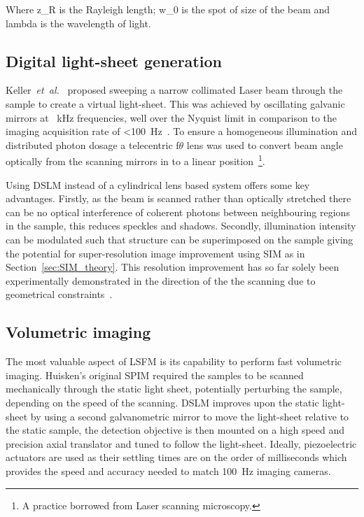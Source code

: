 Where \gls{z_R} is the \gls{Rayleigh length}; \gls{w_0} is the spot of size of the beam and \gls{lambda} is the wavelength of light.


\subsection{Digital \gls{light-sheet} generation}

Keller~\emph{et~al.}~\cite{keller_quantitative_2008} proposed sweeping a narrow collimated \gls{Laser} beam through the sample to create a \gls{virtual light-sheet}.
This was achieved by oscillating galvanic mirrors at \SI{}{\kilo\hertz} frequencies, well over the Nyquist limit in comparison to the imaging acquisition rate of \SI{<100}{\hertz}~\cite{keller_quantitative_2008}.
To ensure a homogeneous illumination and distributed photon dosage a \gls{telecentric} f\(\theta \) lens was used to convert beam angle optically from the scanning mirrors in to a linear position~\footnote{A practice borrowed from \gls{Laser} scanning microscopy.}.

Using \gls{DSLM} instead of a cylindrical lens based system offers some key advantages.
Firstly, as the beam is scanned rather than optically stretched there can be no optical interference of coherent photons between neighbouring regions in the sample, this reduces speckles and shadows.
Secondly, illumination intensity can be modulated such that structure can be superimposed on the sample giving the potential for \gls{super-resolution} image improvement using \gls{SIM} as in Section~\ref{sec:SIM_theory}.
This resolution improvement has so far solely been experimentally demonstrated in the direction of the the scanning due to geometrical constraints~\cite{chen_lattice_2014}.

\subsection{Volumetric imaging}

The most valuable aspect of \gls{LSFM} is its capability to perform fast volumetric imaging.
Huisken's original \gls{SPIM} required the samples to be scanned mechanically through the static light sheet, potentially perturbing the sample, depending on the speed of the scanning.
\gls{DSLM} improves upon the static \gls{light-sheet} by using a second galvanometric mirror to move the \gls{light-sheet} relative to the static sample, the detection objective is then mounted on a high speed and precision axial translator and tuned to follow the \gls{light-sheet}.
Ideally, piezoelectric actuators are used as their settling times are on the order of milliseconds which provides the speed and accuracy needed to match \SI{100}{\hertz} imaging cameras.

